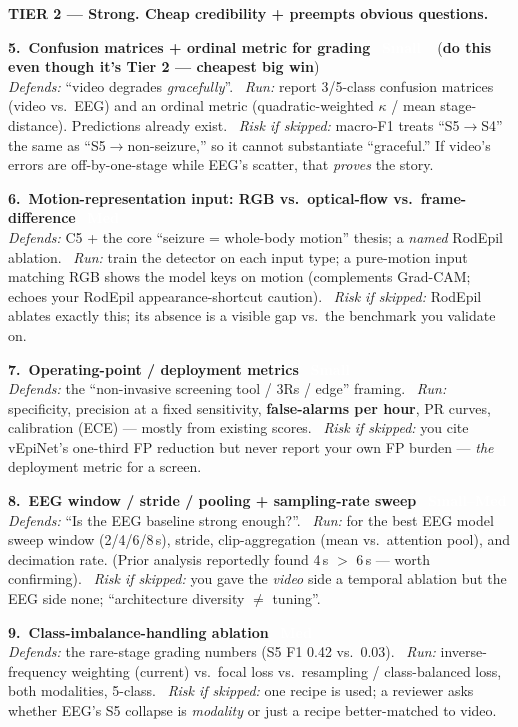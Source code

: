 \documentclass[11pt]{article}
\newcommand{\eff}[2]{\,\colorbox{#1}{\textcolor{white}{\scriptsize\bfseries\,#2\,}}}
\newcommand{\effS}{\eff{effS}{Small}}
\newcommand{\effM}{\eff{effM}{Med}}
\newcommand{\effSM}{\eff{effM}{Small--Med}}
\newcommand{\tier}[2]{%
  \vspace{6pt}\par\noindent{\color{#1}\rule{\linewidth}{2.2pt}}\par\vspace{1pt}%
  {\large\bfseries\color{#1} #2}\par\vspace{3pt}}
\newcommand{\dfd}[1]{{\itshape Defends:} #1.\ }
\newcommand{\run}[1]{{\itshape Run:} #1.\ }
\newcommand{\rsk}[1]{{\itshape Risk if skipped:} #1.}
\begin{document}
\tier{t2}{TIER 2 --- Strong. Cheap credibility + preempts obvious questions.}
\begin{checks}
  \item \textbf{5.\ Confusion matrices + ordinal metric for grading}\ \effS\ \ {\small(\textbf{do this even though it's Tier 2 --- cheapest big win})}\\
  \dfd{``video degrades \emph{gracefully}''}
  \run{report 3/5-class confusion matrices (video vs.\ EEG) and an ordinal metric (quadratic-weighted $\kappa$ / mean stage-distance). Predictions already exist}
  \rsk{macro-F1 treats ``S5$\to$S4'' the same as ``S5$\to$non-seizure,'' so it cannot substantiate ``graceful.'' If video's errors are off-by-one-stage while EEG's scatter, that \emph{proves} the story}

  \item \textbf{6.\ Motion-representation input: RGB vs.\ optical-flow vs.\ frame-difference}\ \effM\\
  \dfd{C5 + the core ``seizure = whole-body motion'' thesis; a \emph{named} RodEpil ablation}
  \run{train the detector on each input type; a pure-motion input matching RGB shows the model keys on motion (complements Grad-CAM; echoes your RodEpil appearance-shortcut caution)}
  \rsk{RodEpil ablates exactly this; its absence is a visible gap vs.\ the benchmark you validate on}

  \item \textbf{7.\ Operating-point / deployment metrics}\ \effS\\
  \dfd{the ``non-invasive screening tool / 3Rs / edge'' framing}
  \run{specificity, precision at a fixed sensitivity, \textbf{false-alarms per hour}, PR curves, calibration (ECE) --- mostly from existing scores}
  \rsk{you cite vEpiNet's one-third FP reduction but never report your own FP burden --- \emph{the} deployment metric for a screen}

  \item \textbf{8.\ EEG window / stride / pooling + sampling-rate sweep}\ \effSM\\
  \dfd{``Is the EEG baseline strong enough?''}
  \run{for the best EEG model sweep window (2/4/6/8\,s), stride, clip-aggregation (mean vs.\ attention pool), and decimation rate. (Prior analysis reportedly found 4\,s $>$ 6\,s --- worth confirming)}
  \rsk{you gave the \emph{video} side a temporal ablation but the EEG side none; ``architecture diversity $\ne$ tuning''}

  \item \textbf{9.\ Class-imbalance-handling ablation}\ \effM\\
  \dfd{the rare-stage grading numbers (S5 F1 0.42 vs.\ 0.03)}
  \run{inverse-frequency weighting (current) vs.\ focal loss vs.\ resampling / class-balanced loss, both modalities, 5-class}
  \rsk{one recipe is used; a reviewer asks whether EEG's S5 collapse is \emph{modality} or just a recipe better-matched to video}


\end{checks}
\end{document}
